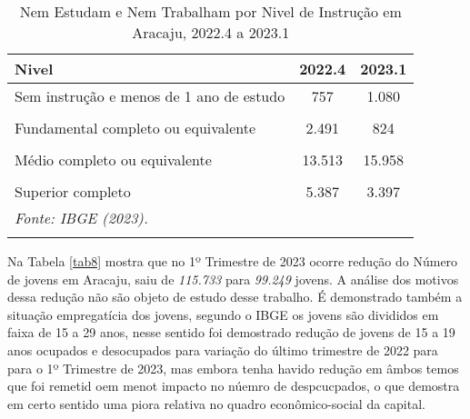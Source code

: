 \documentclass[preprint, 3p,
authoryear]{elsarticle} %
\begin{document}
\begingroup\fontsize{9}{11}\selectfont

\begin{longtable}[t]{lcc}
\caption{\label{tab:tab7}\label{tab7}Nem Estudam e Nem Trabalham por Nivel de Instrução em Aracaju, 2022.4 a 2023.1}\\
\toprule
Nivel & 2022.4 & 2023.1\\
\midrule
Sem instrução e menos de 1 ano de estudo & 757 & 1.080\\
\cellcolor[HTML]{DCDCDC}{Fundamental incompleto ou equivalente} & \cellcolor[HTML]{DCDCDC}{5.301} & \cellcolor[HTML]{DCDCDC}{8.316}\\
Fundamental completo ou equivalente & 2.491 & 824\\
\cellcolor[HTML]{DCDCDC}{Médio incompleto ou equivalente} & \cellcolor[HTML]{DCDCDC}{4.625} & \cellcolor[HTML]{DCDCDC}{2.937}\\
Médio completo ou equivalente & 13.513 & 15.958\\
\addlinespace
\cellcolor[HTML]{DCDCDC}{Superior incompleto ou equivalente} & \cellcolor[HTML]{DCDCDC}{1.827} & \cellcolor[HTML]{DCDCDC}{1.794}\\
Superior completo & 5.387 & 3.397\\
\bottomrule
\multicolumn{3}{l}{\rule{0pt}{1em}\textit{Fonte: IBGE (2023).}}\\
\multicolumn{3}{l}{\rule{0pt}{1em}}\\
\end{longtable}
\endgroup{}

Na Tabela \ref{tab8} mostra que no 1º Trimestre de 2023 ocorre redução
do Número de jovens em Aracaju, saiu de \emph{115.733} para
\emph{99.249} jovens. A análise dos motivos dessa redução não são objeto
de estudo desse trabalho. É demonstrado também a situação empregatícia
dos jovens, segundo o IBGE \citeyearpar{ibge2023} os jovens são
divididos em faixa de 15 a 29 anos, nesse sentido foi demostrado redução
de jovens de 15 a 19 anos ocupados e desocupados para variação do último
trimestre de 2022 para para o 1º Trimestre de 2023, mas embora tenha
havido redução em âmbos temos que foi remetid oem menot impacto no
núemro de despcucpados, o que demostra em certo sentido uma piora
relativa no quadro econômico-social da capital. \newpage
\begingroup\fontsize{9}{11}\selectfont
\end{document}
